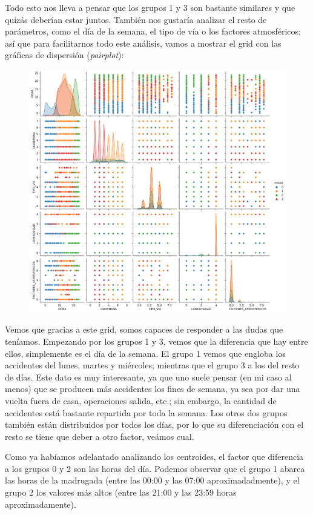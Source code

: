 \documentclass[11pt,a4paper]{article}
\begin{document}
Todo esto nos lleva a pensar que los grupos 1 y 3 son bastante similares y que quizás deberían estar juntos. También nos gustaría
analizar el resto de parámetros, como el día de la semana, el tipo de vía o los factores atmosféricos; así que para facilitarnos
todo este análisis, vamos a mostrar el grid con las gráficas de dispersión (\textit{pairplot}):

\begin{figure}[H]
    \centering
    \includegraphics[scale=0.3]{img/pairplot-and.png}
\end{figure}

Vemos que gracias a este grid, somos capaces de responder a las dudas que teníamos. Empezando por los grupos 1 y 3, vemos que la
diferencia que hay entre ellos, simplemente es el día de la semana. El grupo 1 vemos que engloba los accidentes del lunes, martes
y miércoles; mientras que el grupo 3 a los del resto de días. Este dato es muy interesante, ya que uno suele pensar (en mi caso al
menos) que se producen más accidentes los fines de semana, ya sea por dar una vuelta fuera de casa, operaciones salida, etc.; sin
embargo, la cantidad de accidentes está bastante repartida por toda la semana. Los otros dos grupos también están distribuidos por
todos los días, por lo que su diferenciación con el resto se tiene que deber a otro factor, veámos cual.

Como ya habíamos adelantado analizando los centroides, el factor que diferencia a los grupos 0 y 2 son las horas del día. Podemos
observar que el grupo 1 abarca las horas de la madrugada (entre las 00:00 y las 07:00 aproximadadmente), y el grupo 2 los valores
más altos (entre las 21:00 y las 23:59 horas aproximadamente).
\end{document}
